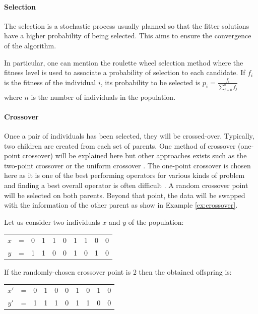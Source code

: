 \paragraph{Selection}
The selection is a stochastic process usually planned so that the fitter solutions have a higher probability of being selected. This aims to ensure the convergence of the algorithm.

In particular, one can mention the roulette wheel selection method where the fitness level is used to associate a probability of selection to each candidate. If $f_i$ is the fitness of the individual $i$, its probability to be selected is $p_i = \frac{f_i}{\sum_{j=0}^{n}f_j}$ where $n$ is the number of individuals in the population.

\paragraph{Crossover}
Once a pair of individuals has been selected, they will be crossed-over. Typically, two children are created from each set of parents. One method of crossover (one-point crossover) will be explained here but other approaches exists such as the two-point crossover or the uniform crossover \cite{vekaria1998}. The one-point crossover is chosen here as it is one of the best performing operators for various kinds of problem and finding a best overall operator is often difficult \cite{picek2012}. A random crossover point will be selected on both parents. Beyond that point, the data will be swapped with the information of the other parent as show in Example \ref{ex:crossover}.

\begin{example}
\label{ex:crossover}
Let us consider two individuals $x$ and $y$ of the population:
\begin{table}[h!]
\begin{center}
\begin{tabular}{cccccccccc}
$x$ & = & 0 & 1 & 1 & 0 & 1 & 1 & 0 & 0\\
$y$ & = & 1 & 1 & 0 & 0 & 1 & 0 & 1 & 0
\end{tabular}
\end{center}
\end{table}

\noindent
If the randomly-chosen crossover point is 2 then the obtained offspring is:
\begin{table}[h!]
\begin{center}
\begin{tabular}{cccc|cccccc}
$x'$ & = & 0 & 1 & 0 & 0 & 1 & 0 & 1 & 0\\
$y'$ & = & 1 & 1 & 1 & 0 & 1 & 1 & 0 & 0
\end{tabular}
\end{center}
\end{table}
\end{example}

